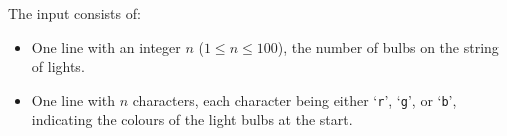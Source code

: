 
    The input consists of:
    \begin{itemize}
        \item One line with an integer $n$ ($1 \leq n \leq 100$),
            the number of bulbs on the string of lights.
        \item One line with $n$ characters, each character being either `\texttt r', `\texttt g', or `\texttt b',
            indicating the colours of the light bulbs at the start.
    \end{itemize}
